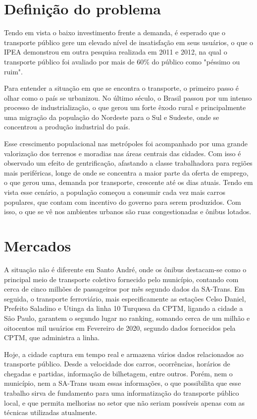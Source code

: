 \section{Definição do problema}
\indent
\par Tendo em vista o baixo investimento frente a demanda, é esperado que o transporte público gere um elevado nível de insatisfação em seus usuários, o que o IPEA demonstrou em outra pesquisa realizada em 2011 e 2012, na qual o transporte público foi avaliado por mais de 60\% do público como "péssimo ou ruim".
\par Para entender a situação em que se encontra o transporte, o primeiro passo é olhar como o país se urbanizou. No último século, o Brasil passou por um intenso processo de industrialização, o que gerou um forte êxodo rural e principalmente uma migração da população do Nordeste para o Sul e Sudeste, onde se concentrou a produção industrial do país.
\par Esse crescimento populacional nas metrópoles foi acompanhado por uma grande valorização dos terrenos e moradias nas áreas centrais das cidades. Com isso é observado um efeito de gentrificação, afastando a classe trabalhadora para regiões mais periféricas, longe de onde se concentra a maior parte da oferta de emprego, o que gerou uma, demanda por transporte, crescente até os dias atuais.
Tendo em vista esse cenário, a população começou a consumir cada vez mais carros populares, que contam com incentivo do governo para serem produzidos. Com isso, o que se vê nos ambientes urbanos são ruas congestionadas e ônibus lotados.

\section{Mercados}
\indent
\par A situação não é diferente em Santo André, onde os ônibus destacam-se como o principal meio de transporte coletivo fornecido pelo município, contando com cerca de cinco milhões de passageiros por mês segundo dados da SA-Trans. Em seguida, o transporte ferroviário, mais especificamente as estações Celso Daniel, Prefeito Saladino e Utinga da linha 10 Turquesa da CPTM, ligando a cidade a São Paulo, garantem o segundo lugar no ranking, somando cerca de um milhão e oitocentos mil usuários em Fevereiro de 2020, segundo dados fornecidos pela CPTM, que administra a linha.
\par Hoje, a cidade captura em tempo real e armazena vários dados relacionados ao transporte público. Desde a velocidade dos carros, ocorrências, horários de chegadas e partidas, informação de bilhetagem, entre outros. Porém, nem o município, nem a SA-Trans usam essas informações, o que possibilita que esse trabalho sirva de fundamento para uma informatização do transporte público local, e que permita melhorias no setor que não seriam possíveis apenas com as técnicas utilizadas atualmente.

